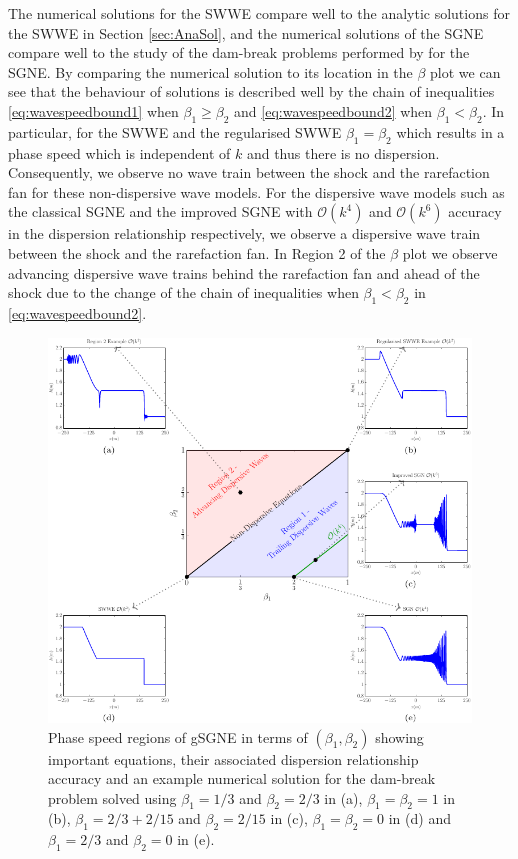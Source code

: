 \documentclass[10pt]{elsarticle}
\begin{document}
The numerical solutions for the SWWE compare well to the analytic solutions for the SWWE in Section \ref{sec:AnaSol}, and the numerical solutions of the SGNE compare well to the study of the dam-break problems performed by \citet{Pitt-2018-61} for the SGNE. By comparing the numerical solution to its location in the $\beta$ plot we can see that the behaviour of solutions is described well by the chain of inequalities \eqref{eq:wavespeedbound1} when $\beta_1 \ge \beta_2$ and \eqref{eq:wavespeedbound2} when $\beta_1 < \beta_2$. In particular, for the SWWE and the regularised SWWE $\beta_1 = \beta_2$ which results in a phase speed which is independent of $k$ and thus there is no dispersion. Consequently, we observe no wave train between the shock and the rarefaction fan for these non-dispersive wave models. For the dispersive wave models such as the classical SGNE and the improved SGNE with $\mathcal{O}(k^4)$ and $\mathcal{O}(k^6)$ accuracy in the dispersion relationship respectively, we observe a dispersive wave train between the shock and the rarefaction fan. In Region 2 of the $\beta$ plot we observe advancing dispersive wave trains behind the rarefaction fan and ahead of the shock due to the change of the chain of inequalities when $\beta_1 < \beta_2$ in \eqref{eq:wavespeedbound2}. 
%
\begin{figure}
	\centering
	\includegraphics[width=\textwidth]{./Figures/Simulations/Comparison/3x3Grid.pdf}
	\caption{Phase speed regions of gSGNE in terms of $\left(\beta_1,\beta_2\right)$ showing important equations, their associated dispersion relationship accuracy and an example numerical solution for the dam-break problem solved using $\beta_1 = 1/3$ and $\beta_2 = 2/3$ in (a), $\beta_1 = \beta_2 = 1$ in (b), $\beta_1 = 2/3 + 2/15$ and $\beta_2 = 2/15$ in (c), $\beta_1 = \beta_2 = 0$ in (d) and $\beta_1 = 2/3$ and $\beta_2 = 0$ in (e).  }
	\label{Fig:WaveSpeedRegGrid}
\end{figure}
\end{document}
